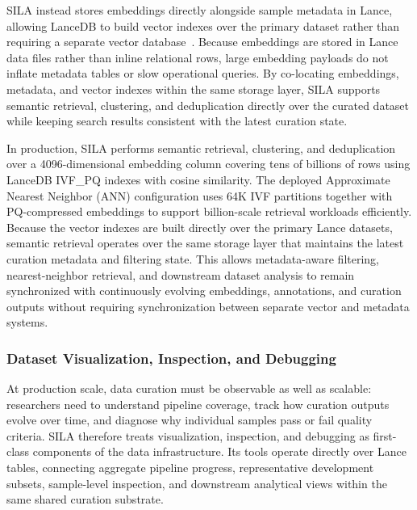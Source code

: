 SILA instead stores embeddings directly alongside sample metadata in Lance, allowing LanceDB to build vector indexes over the primary dataset rather than requiring a separate vector database~\citep{lancedb2026vectorindexes}. Because embeddings are stored in Lance data files rather than inline relational rows, large embedding payloads do not inflate metadata tables or slow operational queries. By co-locating embeddings, metadata, and vector indexes within the same storage layer, SILA supports semantic retrieval, clustering, and deduplication directly over the curated dataset while keeping search results consistent with the latest curation state.

In production, SILA performs semantic retrieval, clustering, and deduplication over a 4096-dimensional embedding column covering tens of billions of rows using LanceDB IVF\_PQ indexes with cosine similarity. The deployed Approximate Nearest Neighbor (ANN) configuration uses 64K IVF partitions together with PQ-compressed embeddings to support billion-scale retrieval workloads efficiently. Because the vector indexes are built directly over the primary Lance datasets, semantic retrieval operates over the same storage layer that maintains the latest curation metadata and filtering state. This allows metadata-aware filtering, nearest-neighbor retrieval, and downstream dataset analysis to remain synchronized with continuously evolving embeddings, annotations, and curation outputs without requiring synchronization between separate vector and metadata systems.

\subsubsection{Dataset Visualization, Inspection, and Debugging}

At production scale, data curation must be observable as well as scalable: researchers need to understand pipeline coverage, track how curation outputs evolve over time, and diagnose why individual samples pass or fail quality criteria. SILA therefore treats visualization, inspection, and debugging as first-class components of the data infrastructure. Its tools operate directly over Lance tables, connecting aggregate pipeline progress, representative development subsets, sample-level inspection, and downstream analytical views within the same shared curation substrate.

